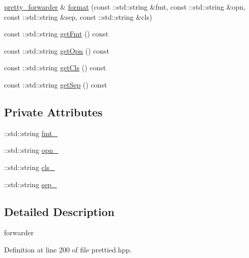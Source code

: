 \begin{DoxyCompactItemize}
$$\item 
\hyperlink{structyuh_1_1range__detail_1_1pretty__forwarder}{pretty\-\_\-forwarder} \& \hyperlink{structyuh_1_1range__detail_1_1pretty__forwarder_ab3eec6fcb56e23d7082dac9de753d77d}{format} (const \-::std\-::string \&fmt, const \-::std\-::string \&opn, const \-::std\-::string \&sep, const \-::std\-::string \&cls)
\item 
const \-::std\-::string \hyperlink{structyuh_1_1range__detail_1_1pretty__forwarder_a7fd7295efbe5ba53f617a232bee5f452}{get\-Fmt} () const 
\item 
const \-::std\-::string \hyperlink{structyuh_1_1range__detail_1_1pretty__forwarder_a0b4e60f304bde0c5b7f6e6395251ec2d}{get\-Opn} () const 
\item 
const \-::std\-::string \hyperlink{structyuh_1_1range__detail_1_1pretty__forwarder_a24ed4840d427c18f4376b9df6928eeec}{get\-Cls} () const 
\item 
const \-::std\-::string \hyperlink{structyuh_1_1range__detail_1_1pretty__forwarder_a1bfec2c494ec4ca408939de76e15bd0c}{get\-Sep} () const 
\end{DoxyCompactItemize}
\subsection*{\-Private \-Attributes}
\begin{DoxyCompactItemize}
\item 
\-::std\-::string \hyperlink{structyuh_1_1range__detail_1_1pretty__forwarder_a10e6f92b15963cf8b984dcd448cb88cc}{fmt\-\_\-}
\item 
\-::std\-::string \hyperlink{structyuh_1_1range__detail_1_1pretty__forwarder_a18de53e582d18b754d97ebc4c23a24f2}{opn\-\_\-}
\item 
\-::std\-::string \hyperlink{structyuh_1_1range__detail_1_1pretty__forwarder_a91d9929bdbd7f866ff9823f657a36d35}{cls\-\_\-}
\item 
\-::std\-::string \hyperlink{structyuh_1_1range__detail_1_1pretty__forwarder_ae32c4a9c66e100eb1bc143c4e851fb2f}{sep\-\_\-}
\end{DoxyCompactItemize}


\subsection{\-Detailed \-Description}
forwarder 

\-Definition at line 200 of file prettied.\-hpp.



